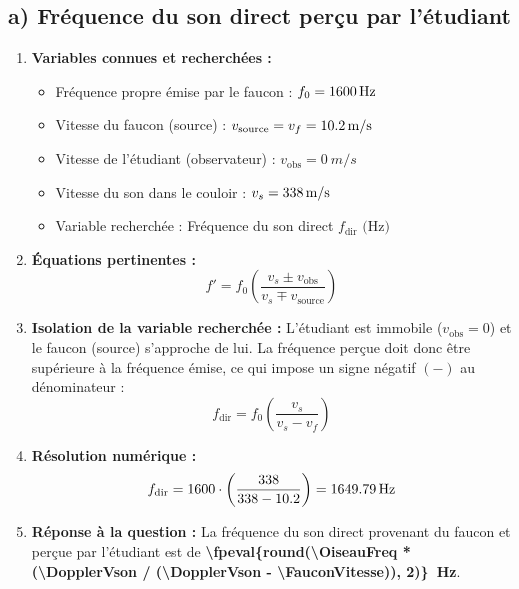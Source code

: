 \subsection*{a) Fréquence du son direct perçu par l'étudiant}

\begin{enumerate}[label=\arabic*)]
    \item \textbf{Variables connues et recherchées :}
    \begin{itemize}[label=$\bullet$]
        \item Fréquence propre émise par le faucon : $f_0 = \qty{1600}{Hz}$
        \item Vitesse du faucon (source) : $v_{\text{source}} = v_f = \qty{10.2}{m/s}$
        \item Vitesse de l'étudiant (observateur) : $v_{\text{obs}} = \qty{0}{m/s}$
        \item Vitesse du son dans le couloir : $v_s = \qty{338}{m/s}$
        \item Variable recherchée : Fréquence du son direct $f_{\text{dir}} \text{ (Hz)}$
    \end{itemize}

    \item \textbf{Équations pertinentes :}
    \[
    f' = f_0 \left( \frac{v_s \pm v_{\text{obs}}}{v_s \mp v_{\text{source}}} \right)
    \]

    \item \textbf{Isolation de la variable recherchée :}
    L'étudiant est immobile ($v_{\text{obs}} = 0$) et le faucon (source) s'approche de lui. La fréquence perçue doit donc être supérieure à la fréquence émise, ce qui impose un signe négatif $(-)$ au dénominateur :
    \[
    f_{\text{dir}} = f_0 \left( \frac{v_s}{v_s - v_f} \right)
    \]

    \item \textbf{Résolution numérique :}
    \[
    f_{\text{dir}} = \OiseauFreq \cdot \left( \frac{\DopplerVson}{\DopplerVson - \FauconVitesse} \right) = \qty{\fpeval{round(\OiseauFreq * (\DopplerVson / (\DopplerVson - \FauconVitesse)), 2)}}{Hz}
    \]

    \item \textbf{Réponse à la question :}
    La fréquence du son direct provenant du faucon et perçue par l'étudiant est de \textbf{\qty{\fpeval{round(\OiseauFreq * (\DopplerVson / (\DopplerVson - \FauconVitesse)), 2)}}{Hz}}.
\end{enumerate}



